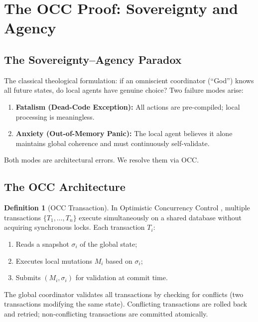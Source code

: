 \documentclass[12pt, a4paper]{article}
\theoremstyle{plain}
\theoremstyle{definition}
\newtheorem{definition}[theorem]{Definition}
\theoremstyle{remark}
\begin{document}
\section{The OCC Proof: Sovereignty and Agency}\label{sec:occ}

\subsection{The Sovereignty--Agency Paradox}

The classical theological formulation: if an omniscient coordinator
(``God'') knows all future states, do local agents have genuine choice?
Two failure modes arise:

\begin{enumerate}[label=(\alph*)]
  \item \textbf{Fatalism (Dead-Code Exception):} All actions are
    pre-compiled; local processing is meaningless.
  \item \textbf{Anxiety (Out-of-Memory Panic):} The local agent believes
    it alone maintains global coherence and must continuously self-validate.
\end{enumerate}

Both modes are architectural errors. We resolve them via OCC.

\subsection{The OCC Architecture}

\begin{definition}[OCC Transaction]\label{def:occ}
  In Optimistic Concurrency Control \citep{Kung1981}, multiple transactions
  $\{T_1, \ldots, T_n\}$ execute simultaneously on a shared database
  without acquiring synchronous locks. Each transaction $T_i$:
  \begin{enumerate}[label=(\roman*)]
    \item Reads a snapshot $\sigma_i$ of the global state;
    \item Executes local mutations $M_i$ based on $\sigma_i$;
    \item Submits $(M_i, \sigma_i)$ for validation at commit time.
  \end{enumerate}
  The global coordinator validates all transactions by checking for
  conflicts (two transactions modifying the same state). Conflicting
  transactions are rolled back and retried; non-conflicting transactions
  are committed atomically.
\end{definition}
\end{document}
